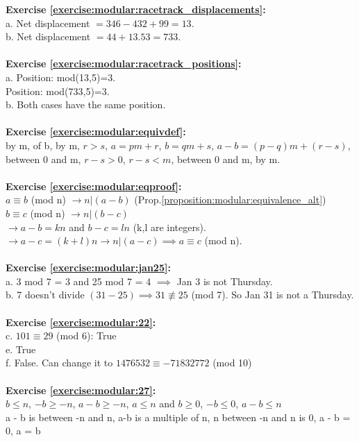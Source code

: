 \noindent\textbf{Exercise \ref{exercise:modular:racetrack_displacements}:}\\
a. Net displacement $=346-432+99=13$.\\
b. Net displacement $=44+13.53=733$.\\
\\
\textbf{Exercise \ref{exercise:modular:racetrack_positions}:}\\
a. Position: mod(13,5)=3.\\
   Position: mod(733,5)=3.\\
b. Both cases have the same position.\\
\\
\textbf{Exercise \ref{exercise:modular:equivdef}:}\\
by m, of b, by m, $r>s$, $a=pm+r$, $b=qm+s$, $a-b=(p-q)m+(r-s)$, between 0 and m, $r-s>0$, $r-s<m$, between 0 and m, by m.\\
\\
\textbf{Exercise \ref{exercise:modular:eqproof}:}\\
$a \equiv b$ (mod n) $\rightarrow n|(a-b)$ (Prop.\ref{proposition:modular:equivalence_alt})\\
$b \equiv c$ (mod n) $\rightarrow n|(b-c)$\\
$\rightarrow a-b=kn$ and $ b-c=ln$ (k,l are integers).\\
$\rightarrow a-c=(k+l)n \rightarrow n|(a-c) \implies a \equiv c$ (mod n).\\
\\
\textbf{Exercise \ref{exercise:modular:jan25}:}\\
a. 3 mod 7 = 3 and 25 mod 7 = 4 $\implies$  Jan 3 is not Thursday.\\
b. 7 doesn't divide $(31 - 25) \implies 31 \not\equiv 25$ (mod 7). So Jan 31 is not a Thursday.\\
\\
\textbf{Exercise \ref{exercise:modular:22}:}\\
c. $101 \equiv 29$ (mod 6): True\\
e. True\\
f. False. Can change it to $1476532 \equiv -71832772$ (mod 10)\\
\\
\textbf{Exercise \ref{exercise:modular:27}:}\\
$b \le n$, $-b \ge -n$, $a-b \ge -n$, $a \le n$ and $b \ge 0$, $-b \le 0$, $a-b \le n$\\
a - b is between -n and n, a-b is a multiple of n, n between -n and n is 0, a - b = 0, a = b\\
